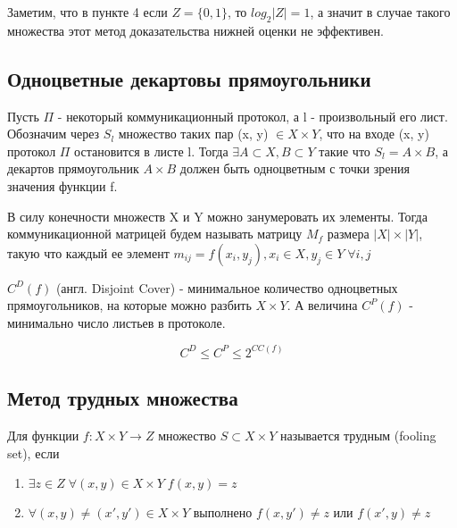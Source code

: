 \documentclass[12pt]{article}
\begin{document}
Заметим, что в пункте 4 если $Z=\{0,1\}$, то $log_2|Z| = 1$, а значит в случае такого множества этот метод доказательства нижней оценки не эффективен.

\subsection{Одноцветные декартовы прямоугольники}

\begin{Statement}
Пусть $\Pi$ - некоторый коммуникационный протокол, а l - произвольный его лист.
Обозначим через $S_l$ множество таких пар (x, y) $\in X \times Y$,
что на входе (x, y) протокол $\Pi$ остановится в листе l.
Тогда $\exists A \subset X, B \subset Y$ такие что $S_l = A \times B$, а декартов прямоугольник $A \times B$ должен быть одноцветным с точки зрения значения функции f.
\end{Statement}

\begin{Def}
    В силу конечности множеств X и Y можно занумеровать их элементы.
    Тогда коммуникационной матрицей будем называть матрицу $M_f$ размера $|X| \times |Y|$,
    такую что каждый ее элемент $m_{ij} = f(x_i, y_j), x_i \in X, y_j \in Y \; \forall i, j$
\end{Def}

\begin{Def}
    $C^D(f)$ (англ. Disjoint Cover) - минимальное количество одноцветных прямоугольников, на которые можно разбить $X \times Y$.
    А величина $C^P(f)$ - минимально число листьев в протоколе.
\end{Def}

\begin{Statement}
    $$C^D \leq C^P \leq 2^{CC(f)}$$
\end{Statement}

\subsection{Метод трудных множества}
\begin{Def}
    Для функции $ f \colon X \times Y \rightarrow Z $
    множество $S \subset X \times Y$ называется трудным (fooling set),
    если
    \begin{enumerate}
        \item
        $\exists z \in Z \; \forall (x,y) \in X \times Y \; f(x,y)=z$
        \item
        $\forall (x,y)\ne(x',y') \in X \times Y$ выполнено
        $f(x,y') \ne z$ или $f(x',y) \ne z$
    \end{enumerate}
\end{Def}
\end{document}
